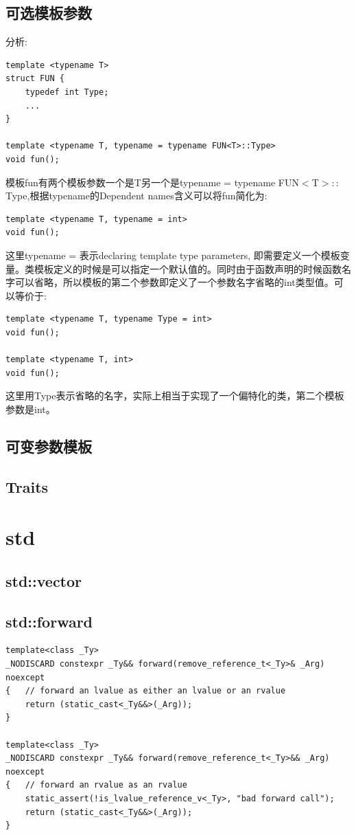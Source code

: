 \documentclass[12pt]{book}
\begin{document}
\subsection{可选模板参数}
分析:
\begin{lstlisting}
template <typename T>
struct FUN {
	typedef int Type;
	...
}

template <typename T, typename = typename FUN<T>::Type>
void fun();
\end{lstlisting}
模板fun有两个模板参数一个是T另一个是typename = typename FUN$<$T$>::$Type,根据typename的Dependent names含义可以将fun简化为:
\begin{lstlisting}
template <typename T, typename = int>
void fun();
\end{lstlisting}
这里typename = 表示declaring template type parameters, 即需要定义一个模板变量。类模板定义的时候是可以指定一个默认值的。同时由于函数声明的时候函数名字可以省略，所以模板的第二个参数即定义了一个参数名字省略的int类型值。可以等价于:
\begin{lstlisting}
template <typename T, typename Type = int>
void fun();
	
template <typename T, int>
void fun();
\end{lstlisting}
这里用Type表示省略的名字，实际上相当于实现了一个偏特化的类，第二个模板参数是int。

\subsection{可变参数模板}
\subsection{Traits}
\section{std}
\subsection{std::vector}
\subsection{std::forward}
\begin{lstlisting}
template<class _Ty>
_NODISCARD constexpr _Ty&& forward(remove_reference_t<_Ty>& _Arg) noexcept
{	// forward an lvalue as either an lvalue or an rvalue
	return (static_cast<_Ty&&>(_Arg));
}

template<class _Ty>
_NODISCARD constexpr _Ty&& forward(remove_reference_t<_Ty>&& _Arg) noexcept
{	// forward an rvalue as an rvalue
	static_assert(!is_lvalue_reference_v<_Ty>, "bad forward call");
	return (static_cast<_Ty&&>(_Arg));
}
\end{lstlisting}
\end{document}
